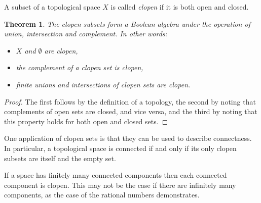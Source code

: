 \documentclass[12pt]{article}
\newtheorem{thm}{Theorem}
\theoremstyle{definition}
\theoremstyle{remark}
\numberwithin{equation}{subsection}
\begin{document}
A subset of a topological space $X$ is called \emph{clopen} if it is both
open and closed.

\begin{thm}
  The clopen subsets form a Boolean algebra under the operation of
  union, intersection and complement. In other words:
  \begin{itemize}
  \item $X$ and $\emptyset$ are clopen,
  \item the complement of a clopen set is clopen,
  \item finite unions and intersections of clopen sets are clopen.
  \end{itemize}
\end{thm}

\begin{proof}
    The first follows by the definition of a topology, the second by
    noting that complements of open sets are closed, and vice versa,
    and the third by noting that this property holds for both open
    and closed sets.
\end{proof}


One application of clopen sets is that they can be used to
describe connectness.  In particular, a topological space is
connected if and only if its only clopen subsets are itself and
the empty set.

If a space has finitely many connected components then each
connected component is clopen. This may not be the case if there 
are infinitely many components, as the case of the rational numbers 
demonstrates.
\end{document}
